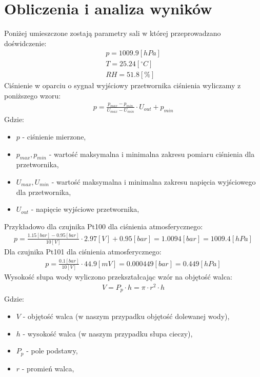 \documentclass[11pt]{article}
\begin{document}
    \section{Obliczenia i analiza wyników}
   \par\noindnet Poniżej umieszczone zostają parametry sali w której przeprowadzano doświdczenie:
    \begin{gather*}
        p=1009.9 [hPa]\\
        T=25.24 [^\circ C]\\
        RH=51.8 [\%]
    \end{gather*}
    \noindent Ciśnienie w oparciu o sygnał wyjściowy przetwornika ciśnienia wyliczamy z poniższego wzoru:
    \begin{gather}
        p=\frac{p_{max}-p_{min}}{U_{max}-U_{min}}\cdot U_{out}+p_{min}
    \end{gather}
    \noindent Gdzie:
        {\footnotesize
    \begin{itemize}
        \setlength\itemsep{0em}
        \item[] \textbf{$p$} - ciśnienie mierzone,
        \item[] \textbf{$p_{max}, p_{min}$} - wartość maksymalna i minimalna zakresu pomiaru ciśnienia dla przetwornika,
        \item[] \textbf{$U_{max}, U_{min}$} - wartość maksymalna i minimalna zakresu napięcia wyjściowego dla przetwornika,
        \item[] \textbf{$U_{out}$} - napięcie wyjściowe przetwornika,
    \end{itemize}}
    \noindent Przykładowo dla czujnika Pt100 dla ciśnienia atmosferycznego:
    \begin{gather}
        p=\frac{1.15 [bar] - 0.95 [bar]}{10[V]}\cdot 2.97[V]+0.95[bar]=1.0094 [bar]=1009.4 [hPa]
    \end{gather}
    \noindent Dla czujnika Pt101 dla ciśnienia atmosferycznego:
    \begin{gather}
        p=\frac{0.1 [bar]}{10[V]}\cdot 44.9[mV]=0.000449 [bar]=0.449 [hPa]
    \end{gather}
    \noindent Wysokość słupa wody wyliczono przekształcając wzór na objętość walca:
    \begin{gather}
        V=P_p\cdot h=\pi\cdot r^2\cdot h
    \end{gather}
    \noindent Gdzie:
        {\footnotesize
    \begin{itemize}
        \setlength\itemsep{0em}
        \item[] \textbf{$V$} - objętość walca (w naszym przypadku objętość dolewanej wody),
        \item[] \textbf{$h$} - wysokość walca (w naszym przypadku słupa cieczy),
        \item[] \textbf{$P_p$} - pole podstawy,
        \item[] \textbf{$r$} - promień walca,
    \end{itemize}}
\end{document}
